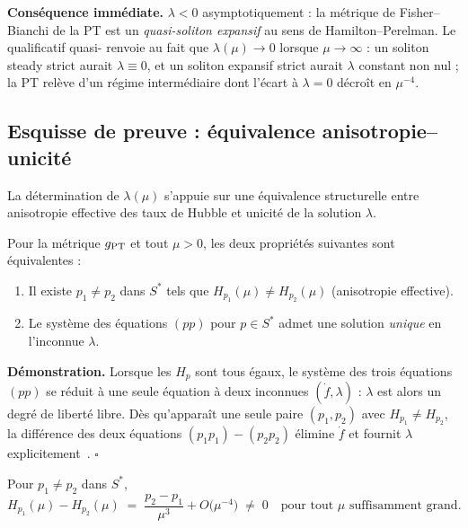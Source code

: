 \textbf{Conséquence immédiate.} $\lambda < 0$ asymptotiquement : la métrique de Fisher--Bianchi de la PT est un \emph{quasi-soliton expansif} au sens de Hamilton--Perelman. Le qualificatif \og quasi-\fg{} renvoie au fait que $\lambda(\mu) \to 0$ lorsque $\mu \to \infty$ : un soliton steady strict aurait $\lambda \equiv 0$, et un soliton expansif strict aurait $\lambda$ constant non nul ; la PT relève d'un régime intermédiaire dont l'écart à $\lambda = 0$ décroît en $\mu^{-4}$.

\subsection{Esquisse de preuve : équivalence anisotropie--unicité}
\label{sec:soliton:proof}

La détermination de $\lambda(\mu)$ s'appuie sur une équivalence structurelle entre anisotropie effective des taux de Hubble et unicité de la solution $\lambda$.

\begin{proposition}[Anisotropie \texorpdfstring{$\Leftrightarrow$}{<=>} unicité de $\lambda$]
\label{prop:anisotropy}
Pour la métrique $g_{\rm PT}$ et tout $\mu > 0$, les deux propriétés suivantes sont équivalentes :
\begin{enumerate}[nosep,label=\textup{(\roman*)}]
\item Il existe $p_1 \neq p_2$ dans $S^{*}$ tels que $H_{p_1}(\mu) \neq H_{p_2}(\mu)$ (anisotropie effective).
\item Le système des équations $(pp)$ pour $p \in S^{*}$ admet une solution \emph{unique} en l'inconnue $\lambda$.
\end{enumerate}
\end{proposition}

\textbf{Démonstration.} Lorsque les $H_p$ sont tous égaux, le système des trois équations $(pp)$ se réduit à une seule équation à deux inconnues $(\dot f, \lambda)$ : $\lambda$ est alors un degré de liberté libre. Dès qu'apparaît une seule paire $(p_1, p_2)$ avec $H_{p_1} \neq H_{p_2}$, la différence des deux équations $(p_1 p_1) - (p_2 p_2)$ élimine $\dot f$ et fournit $\lambda$ explicitement~\cite[\S 4]{PT_GeoFlow_RicciSoliton}. $\square$

\begin{lemme}
\label{lem:H_asymptotic}
Pour $p_1 \neq p_2$ dans $S^{*}$,
\[
H_{p_1}(\mu) - H_{p_2}(\mu) \;=\; \dfrac{p_2 - p_1}{\mu^{3}} + O\!\bigl(\mu^{-4}\bigr) \;\neq\; 0
\quad\text{pour tout } \mu \text{ suffisamment grand.}
\]
\end{lemme}

